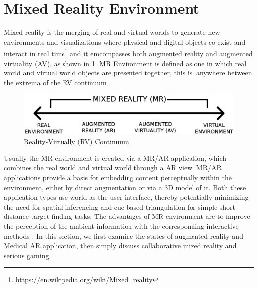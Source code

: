 \section{Mixed Reality Environment}
Mixed reality is the merging of real and virtual worlds to generate new environments and visualizations where physical and digital objects co-exist and interact in real time\footnote{\url{https://en.wikipedia.org/wiki/Mixed_reality}} and it emcompasses both augmented reality and augmented virtuality (AV), as shown in \figurename{\ref{fig:2-bg:Reality-Virtuality_Continuum}}. MR Environment is defined as one in which real world and virtual world objects are presented together, this is, anywhere between the extrema of the RV continuum \cite{Milgram1994a}. 
\begin{figure}
	\centering
	\includegraphics[width=0.8\linewidth]{figures/2-bg/Reality-Virtuality_Continuum}
	\caption{Reality-Virtually (RV) Continuum}
	\label{fig:2-bg:Reality-Virtuality_Continuum}
\end{figure}
Usually the MR environment is created via a MR/AR application, which combines the real world and virtual world through a AR view.
MR/AR applications provide a basis for embedding content perceptually within the environment, either by direct augmentation or via a 3D model of it. Both these application types use world as the user interface, thereby potentially minimizing the need for spatial inferencing and cue-based triangulation for simple short-distance target finding tasks. The advantages of MR environment are to improve the perception of the ambient information with the corresponding interactive methods \cite{Nurminen}. In this section, we first examine the states of augmented reality and Medical AR application, then simply discuss collaborative mixed reality and serious gaming.

